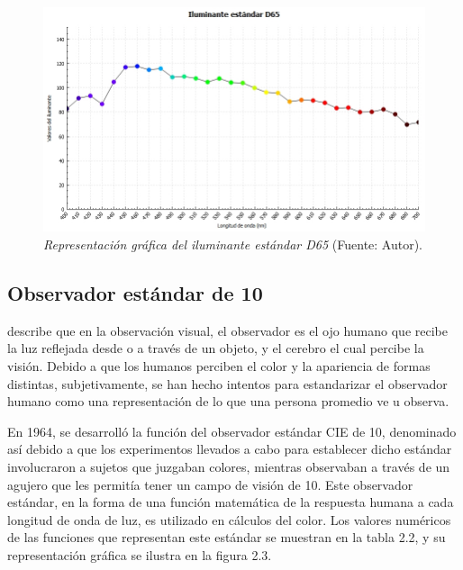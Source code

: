 \FloatBarrier

	\begin{figure}[H]
		\centering
		\includegraphics[scale=0.6]{img/curva-iluminante.jpg}
			\caption[Representaci\'{o}n gr\'{a}fica del iluminante est\'{a}ndar D65]{\textit{Representaci\'{o}n gr\'{a}fica del iluminante est\'{a}ndar D65} (Fuente: Autor).}
	\end{figure}

	\subsection{Observador est\'{a}ndar de 10\degree}
	
		\cite{HunterLab-applications} describe que en la observaci\'{o}n visual, el observador es el ojo humano que recibe la luz reflejada desde o a trav\'{e}s de un objeto, y el cerebro el cual percibe la visi\'{o}n. Debido a que los humanos perciben el color y la apariencia de formas distintas, subjetivamente, se han hecho intentos para estandarizar el observador humano como una representaci\'{o}n de lo que una persona promedio ve u observa.
		
		En 1964, se desarroll\'{o} la funci\'{o}n del observador est\'{a}ndar CIE de 10\degree, denominado as\'{i} debido a que los experimentos llevados a cabo para establecer dicho est\'{a}ndar involucraron a sujetos que juzgaban colores, mientras observaban a trav\'{e}s de un agujero que les permit\'{i}a tener un campo de visi\'{o}n de 10\degree. Este observador est\'{a}ndar, en la forma de una funci\'{o}n matem\'{a}tica de la respuesta humana a cada longitud de onda de luz, es utilizado en c\'{a}lculos del color. Los valores num\'{e}ricos de las funciones que representan este est\'{a}ndar se muestran en la tabla 2.2, y su representaci\'{o}n gr\'{a}fica se ilustra en la figura 2.3.


